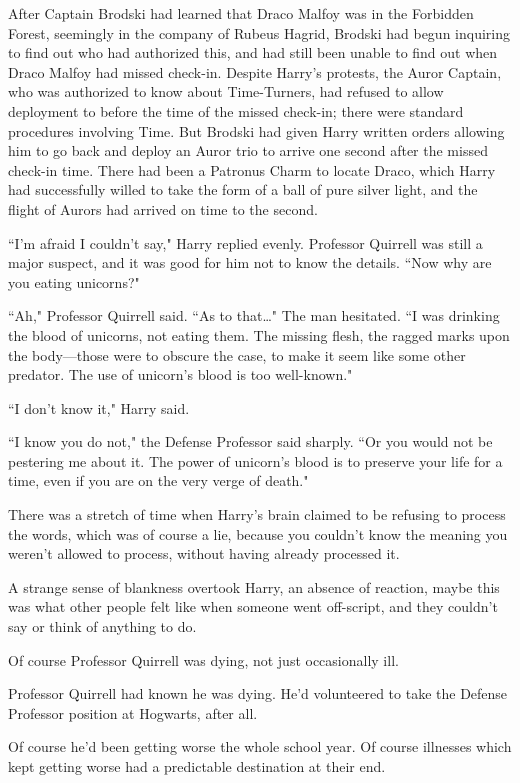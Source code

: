 After Captain Brodski had learned that Draco Malfoy was in the Forbidden Forest, seemingly in the company of Rubeus Hagrid, Brodski had begun inquiring to find out who had authorized this, and had still been unable to find out when Draco Malfoy had missed check-in. Despite Harry's protests, the Auror Captain, who was authorized to know about Time-Turners, had refused to allow deployment to before the time of the missed check-in; there were standard procedures involving Time. But Brodski had given Harry written orders allowing him to go back and deploy an Auror trio to arrive one second after the missed check-in time. There had been a Patronus Charm to locate Draco, which Harry had successfully willed to take the form of a ball of pure silver light, and the flight of Aurors had arrived on time to the second.

``I'm afraid I couldn't say," Harry replied evenly. Professor Quirrell was still a major suspect, and it was good for him not to know the details. ``Now why are you eating unicorns?"

``Ah," Professor Quirrell said. ``As to that{\ldots}" The man hesitated. ``I was drinking the blood of unicorns, not eating them. The missing flesh, the ragged marks upon the body—those were to obscure the case, to make it seem like some other predator. The use of unicorn's blood is too well-known."

``I don't know it," Harry said.

``I know you do not," the Defense Professor said sharply. ``Or you would not be pestering me about it. The power of unicorn's blood is to preserve your life for a time, even if you are on the very verge of death."

There was a stretch of time when Harry's brain claimed to be refusing to process the words, which was of course a lie, because you couldn't know the meaning you weren't allowed to process, without having already processed it.

A strange sense of blankness overtook Harry, an absence of reaction, maybe this was what other people felt like when someone went off-script, and they couldn't say or think of anything to do.

Of course Professor Quirrell was dying, not just occasionally ill.

Professor Quirrell had known he was dying. He'd volunteered to take the Defense Professor position at Hogwarts, after all.

Of course he'd been getting worse the whole school year. Of course illnesses which kept getting worse had a predictable destination at their end.

